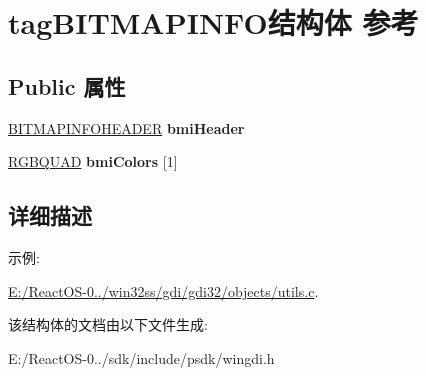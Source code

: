 \hypertarget{structtag_b_i_t_m_a_p_i_n_f_o}{}\section{tag\+B\+I\+T\+M\+A\+P\+I\+N\+F\+O结构体 参考}
\label{structtag_b_i_t_m_a_p_i_n_f_o}
\subsection*{Public 属性}
\begin{DoxyCompactItemize}
\item 
\mbox{\label{structtag_b_i_t_m_a_p_i_n_f_o_a1cbcd562dccbedec498b504f247405c3}} 
\hyperlink{struct_b_i_t_m_a_p_i_n_f_o_h_e_a_d_e_r}{B\+I\+T\+M\+A\+P\+I\+N\+F\+O\+H\+E\+A\+D\+ER} {\bfseries bmi\+Header}
\item 
\mbox{\label{structtag_b_i_t_m_a_p_i_n_f_o_a5a9747ecf91e36b60469f6483ec1980e}} 
\hyperlink{structtag_r_g_b_q_u_a_d}{R\+G\+B\+Q\+U\+AD} {\bfseries bmi\+Colors} \mbox{[}1\mbox{]}
\end{DoxyCompactItemize}


\subsection{详细描述}
\begin{Desc}
\item[示例\+: ]\par
\hyperlink{_e_1_2_react_o_s-0_84_86_2win32ss_2gdi_2gdi32_2objects_2utils_8c-example}{E\+:/\+React\+O\+S-\/0../win32ss/gdi/gdi32/objects/utils.\+c}.\end{Desc}


该结构体的文档由以下文件生成\+:\begin{DoxyCompactItemize}
\item 
E\+:/\+React\+O\+S-\/0../sdk/include/psdk/wingdi.\+h\end{DoxyCompactItemize}
